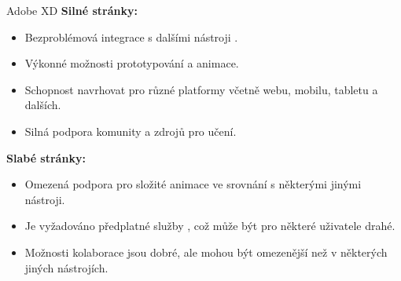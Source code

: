 \begin{subsection}{Adobe XD}
    \textbf{Silné stránky:}
    \begin{itemize}
        \item Bezproblémová integrace s dalšími nástroji .
        \item Výkonné možnosti prototypování a animace.
        \item Schopnost navrhovat pro různé platformy včetně webu, mobilu, tabletu a dalších.
        \item Silná podpora komunity a zdrojů pro učení.
    \end{itemize}

    \textbf{Slabé stránky:}
    \begin{itemize}
        \item Omezená podpora pro složité animace ve srovnání s některými jinými nástroji.
        \item Je vyžadováno předplatné služby , což může být pro některé uživatele drahé.
        \item Možnosti kolaborace jsou dobré, ale mohou být omezenější než v některých jiných nástrojích\cite{w_industry_the_ultimate_battle_figma_vs_sketch_vs_adobe_xd, adobe-xd}.
    \end{itemize}
\end{subsection}

